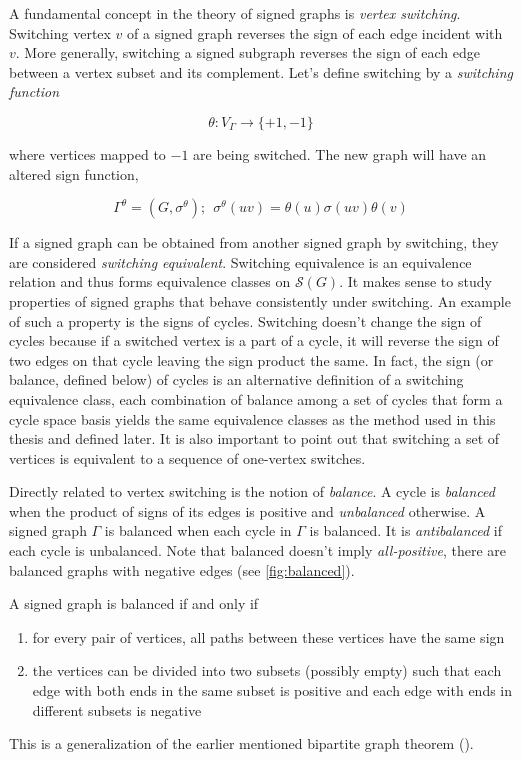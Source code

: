 A fundamental concept in the theory of signed graphs is \textit{vertex switching}. Switching vertex $v$ of a signed graph reverses the sign of each edge incident with $v$. More generally, switching a signed subgraph reverses the sign of each edge between a vertex subset and its complement. Let's define switching by a \textit{switching function}

$$\theta : V_{\Gamma} \rightarrow \{+1, -1\}$$

where vertices mapped to $-1$ are being switched. The new graph will have an altered sign function,

$$\Gamma ^{\theta} = (G, \sigma ^{\theta}); ~~ \sigma ^{\theta} (uv) = \theta (u) \sigma (uv) \theta (v)$$

If a signed graph can be obtained from another signed graph by switching, they are considered \textit{switching equivalent}. Switching equivalence is an equivalence relation and thus forms equivalence classes on $\mathcal{S} (G)$. It makes sense to study properties of signed graphs that behave consistently under switching. An example of such a property is the signs of cycles. Switching doesn't change the sign of cycles because if a switched vertex is a part of a cycle, it will reverse the sign of two edges on that cycle leaving the sign product the same. In fact, the sign (or balance, defined below) of cycles is an alternative definition of a switching equivalence class, each combination of balance among a set of cycles that form a cycle space basis yields the same equivalence classes as the method used in this thesis and defined later. It is also important to point out that switching a set of vertices is equivalent to a sequence of one-vertex switches.

Directly related to vertex switching is the notion of \textit{balance}. A cycle is \textit{balanced} when the product of signs of its edges is positive and \textit{unbalanced} otherwise. A signed graph $\Gamma$ is balanced when each cycle in $\Gamma$ is balanced. It is \textit{antibalanced} if each cycle is unbalanced. Note that balanced doesn't imply \textit{all-positive}, there are balanced graphs with negative edges (see \cref{fig:balanced}).

\begin{theorem}\label{th:harary}
    A signed graph is balanced if and only if
    \begin{enumerate}
        \item for every pair of vertices, all paths between these vertices have the same sign
        \item the vertices can be divided into two subsets (possibly empty) such that each edge with both ends in the same subset is positive and each edge with ends in different subsets is negative
    \end{enumerate}

    This is a generalization of the earlier mentioned bipartite graph theorem ().
\end{theorem}

